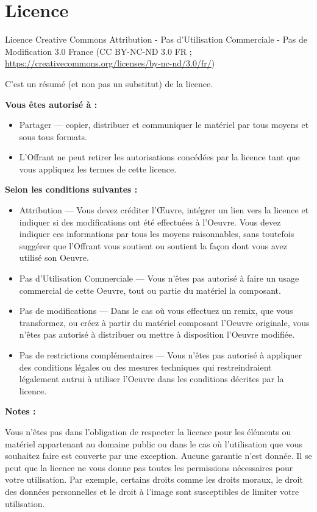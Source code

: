 \documentclass[]{book}
\providecommand{\tightlist}{%
  \setlength{\itemsep}{0pt}\setlength{\parskip}{0pt}}
\theoremstyle{definition}
\theoremstyle{definition}
\theoremstyle{definition}
\theoremstyle{remark}
\begin{document}
\chapter{Licence}\label{licence}

Licence Creative Commons Attribution - Pas d'Utilisation Commerciale -
Pas de Modification 3.0 France (CC BY-NC-ND 3.0 FR ;
\url{https://creativecommons.org/licenses/by-nc-nd/3.0/fr/})

C'est un résumé (et non pas un substitut) de la licence.

\textbf{Vous êtes autorisé à :}

\begin{itemize}
\tightlist
\item
  Partager --- copier, distribuer et communiquer le matériel par tous
  moyens et sous tous formats.
\item
  L'Offrant ne peut retirer les autorisations concédées par la licence
  tant que vous appliquez les termes de cette licence.
\end{itemize}

\textbf{Selon les conditions suivantes :}

\begin{itemize}
\item
  Attribution --- Vous devez créditer l'Œuvre, intégrer un lien vers la
  licence et indiquer si des modifications ont été effectuées à
  l'Oeuvre. Vous devez indiquer ces informations par tous les moyens
  raisonnables, sans toutefois suggérer que l'Offrant vous soutient ou
  soutient la façon dont vous avez utilisé son Oeuvre.
\item
  Pas d'Utilisation Commerciale --- Vous n'êtes pas autorisé à faire un
  usage commercial de cette Oeuvre, tout ou partie du matériel la
  composant.
\item
  Pas de modifications --- Dans le cas où vous effectuez un remix, que
  vous transformez, ou créez à partir du matériel composant l'Oeuvre
  originale, vous n'êtes pas autorisé à distribuer ou mettre à
  disposition l'Oeuvre modifiée.
\item
  Pas de restrictions complémentaires --- Vous n'êtes pas autorisé à
  appliquer des conditions légales ou des mesures techniques qui
  restreindraient légalement autrui à utiliser l'Oeuvre dans les
  conditions décrites par la licence.
\end{itemize}

\textbf{Notes :}

Vous n'êtes pas dans l'obligation de respecter la licence pour les
éléments ou matériel appartenant au domaine public ou dans le cas où
l'utilisation que vous souhaitez faire est couverte par une exception.
Aucune garantie n'est donnée. Il se peut que la licence ne vous donne
pas toutes les permissions nécessaires pour votre utilisation. Par
exemple, certains droits comme les droits moraux, le droit des données
personnelles et le droit à l'image sont susceptibles de limiter votre
utilisation.
\end{document}
